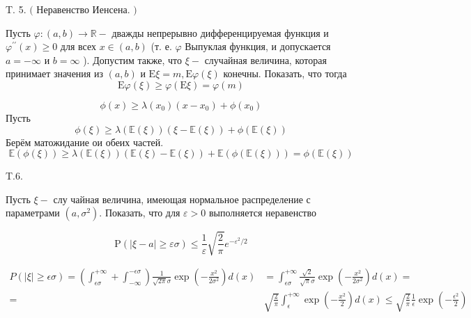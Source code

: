 \documentclass[a4paper,12pt]{article} %
\begin{document}
\begin{example} T. 5. $($ Неравенство Иенсена. $)$ 

Пусть $\varphi:(a, b) \rightarrow \mathbb{R}-$ дважды непрерывно дифференцируемая функция и $\varphi^{\prime \prime}(x) \geq 0$ для всех $x \in(a, b)$ (т. е. $\varphi$ Выпуклая функция, и допускается $a=-\infty$ и $b=\infty$ ). 
Допустим также, что $\xi-$ случайная величина, которая принимает значения из $(a, b)$ и $\mathrm{E} \xi=m, \mathrm{E} \varphi(\xi)$ конечны. Показать, что тогда
$$
\mathrm{E} \varphi(\xi) \geq \varphi(\mathrm{E} \xi)=\varphi(m)
$$



$$
\phi(x) \geq \lambda\left(x_{0}\right)\left(x-x_{0}\right)+\phi\left(x_{0}\right)
$$
Пусть
$$
\phi(\xi) \geq \lambda(\mathbb{E}(\xi))(\xi-\mathbb{E}(\xi))+\phi(\mathbb{E}(\xi))
$$
Берём матожидание ои обеих частей.
$$
\mathbb{E}(\phi(\xi)) \geq \lambda(\mathbb{E}(\xi))(\mathbb{E}(\xi)-\mathbb{E}(\xi))+\mathbb{E}(\phi(\mathbb{E}(\xi)))=\phi(\mathbb{E}(\xi))
$$






\end{example}



\begin{example}



T.6. 


Пусть $\xi-$ слу чайная величина, имеющая нормальное распределение с параметрами $\left(a, \sigma^{2}\right) .$ Показать, что для $\varepsilon>0$ выполняется неравенство

$$
\mathrm{P}(|\xi-a| \geq \varepsilon \sigma) \leq \frac{1}{\varepsilon} \sqrt{\frac{2}{\pi}} e^{-\varepsilon^{2} / 2}
$$



\[ \begin{aligned}
P(|\xi| \geq \epsilon \sigma)
=
\left(\int_{\epsilon \sigma}^{+\infty}
+
\int_{-\infty}^{-\epsilon \sigma}\right) 
\frac{1}{\sqrt{2 \pi} \sigma} 
\exp \left(-\frac{x^{2}}{2 \sigma^{2}}\right) d(x) 
&=
\int_{\epsilon \sigma}^{+\infty} \frac{\sqrt{2}}{\sqrt{\pi} \sigma} \exp \left(-\frac{x^{2}}{2 \sigma^{2}}\right) d(x)
=
\\
=& \sqrt{\frac{2}{\pi}} \int_{\epsilon}^{+\infty} 
\exp \left(-\frac{x^{2}}{2}\right) d(x) 
\leq 
\sqrt{\frac{2}{\pi}} \frac{1}{\epsilon} 
\exp \left(-\frac{\epsilon^{2}}{2}\right)
\end{aligned} \]






\end{example}
\end{document}
